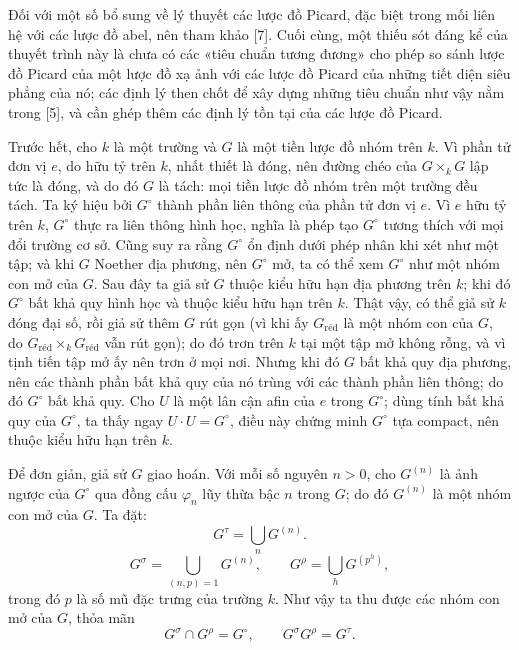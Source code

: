 Đối với một số bổ sung về lý thuyết các lược đồ Picard, đặc biệt trong mối
liên hệ với các lược đồ abel, nên tham khảo [7]. Cuối cùng, một thiếu sót đáng
kể của thuyết trình này là chưa có các «tiêu chuẩn tương đương» cho phép so
sánh lược đồ Picard của một lược đồ xạ ảnh với các lược đồ Picard của những
tiết diện siêu phẳng của nó; các định lý then chốt để xây dựng những tiêu
chuẩn như vậy nằm trong [5], và cần ghép thêm các định lý tồn tại của các
lược đồ Picard.


Trước hết, cho $k$ là một trường và $G$ là một tiền lược đồ nhóm trên $k$.
Vì phần tử đơn vị $e$, do hữu tỷ trên $k$, nhất thiết là đóng, nên đường chéo
của $G\times_kG$ lập tức là đóng, và do đó $G$ là tách: mọi tiền lược đồ nhóm
trên một trường đều tách. Ta ký hiệu bởi $G^\circ$ thành phần liên thông của
phần tử đơn vị $e$. Vì $e$ hữu tỷ trên $k$, $G^\circ$ thực ra liên thông hình
học, nghĩa là phép tạo $G^\circ$ tương thích với mọi đổi trường cơ sở. Cũng
suy ra rằng $G^\circ$ ổn định dưới phép nhân khi xét như một tập; và khi $G$
Noether địa phương, nên $G^\circ$ mở, ta có thể xem $G^\circ$ như một nhóm
con mở của $G$. Sau đây ta giả sử $G$ thuộc kiểu hữu hạn địa phương trên $k$;
khi đó $G^\circ$ bất khả quy hình học và thuộc kiểu hữu hạn trên $k$. Thật
vậy, có thể giả sử $k$ đóng đại số, rồi giả sử thêm $G$ rút gọn (vì khi ấy
$G_{\mathrm{réd}}$ là một nhóm con của $G$, do
$G_{\mathrm{réd}}\times_kG_{\mathrm{réd}}$ vẫn rút gọn); do đó trơn trên
$k$ tại một tập mở không rỗng, và vì tịnh tiến tập mở ấy nên trơn ở mọi nơi.
Nhưng khi đó $G$ bất khả quy địa phương, nên các thành phần bất khả quy của nó
trùng với các thành phần liên thông; do đó $G^\circ$ bất khả quy. Cho $U$ là
một lân cận afin của $e$ trong $G^\circ$; dùng tính bất khả quy của $G^\circ$,
ta thấy ngay
$U\cdot U=G^\circ$, điều này chứng minh $G^\circ$ tựa compact, nên thuộc kiểu
hữu hạn trên $k$.

Để đơn giản, giả sử $G$ giao hoán. Với mỗi số nguyên $n>0$, cho $G^{(n)}$ là
ảnh ngược của $G^\circ$ qua đồng cấu $\varphi_n$ lũy thừa bậc $n$ trong
$G$; do đó $G^{(n)}$ là một nhóm con mở của $G$. Ta đặt:
\[
G^\tau=\bigcup_nG^{(n)}.
\]
\[
G^\sigma=\bigcup_{(n,p)=1}G^{(n)},
\qquad
G^\rho=\bigcup_hG^{(p^h)},
\]
trong đó $p$ là số mũ đặc trưng của trường $k$. Như vậy ta thu được các nhóm
con mở của $G$, thỏa mãn
\[
G^\sigma\cap G^\rho=G^\circ,
\qquad
G^\sigma G^\rho=G^\tau.
\]

